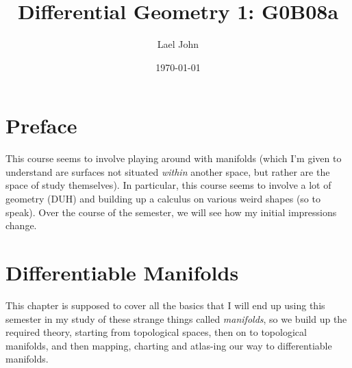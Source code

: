 \documentclass[12pt]{book}
\date{\today}
\title{Differential Geometry 1: G0B08a}
\author{Lael John}
\theoremstyle{definition}
\begin{document}
\maketitle
\chapter*{Preface}
This course seems to involve playing around with manifolds (which I'm given to understand are surfaces not situated \textit{within} another space, but rather are the space of study themselves). In particular, this course seems to involve a lot of geometry (DUH) and building up a calculus on various weird shapes (so to speak). Over the course of the semester, we will see how my initial impressions change.
\tableofcontents
\chapter{Differentiable Manifolds}
This chapter is supposed to cover all the basics that I will end up using this semester in my study of these strange things called \textit{manifolds}, so we build up the required theory, starting from topological spaces, then on to topological manifolds, and then mapping, charting and atlas-ing our way to differentiable manifolds.
\end{document}
